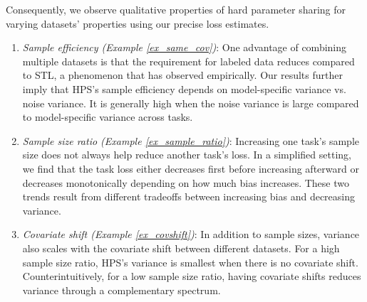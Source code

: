 Consequently, we observe qualitative properties of hard parameter sharing for varying datasets' properties using our precise loss estimates.
\begin{enumerate}
	\item \textit{Sample efficiency (Example \ref{ex_same_cov})}:
	One advantage of combining multiple datasets is that the requirement for labeled data reduces compared to STL, a phenomenon that \citet{ZSSGM18} has observed empirically.
	Our results further imply that HPS's sample efficiency depends on model-specific variance vs. noise variance. It is generally high when the noise variance is large compared to model-specific variance across tasks.
	\item \textit{Sample size ratio (Example \ref{ex_sample_ratio})}: Increasing one task's sample size does not always help reduce another task's loss. In a simplified setting, we find that the task loss either decreases first before increasing afterward or decreases monotonically depending on how much bias increases. These two trends result from different tradeoffs between increasing bias and decreasing variance.
	\item \textit{Covariate shift (Example \ref{ex_covshift})}: In addition to sample sizes, variance also scales with the covariate shift between different datasets. For a high sample size ratio, HPS's  variance is smallest when there is no covariate shift. Counterintuitively, for a low sample size ratio, having covariate shifts reduces variance through a complementary spectrum.
\end{enumerate}


